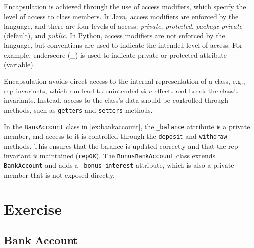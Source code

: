 \documentclass[oneside,11pt,dvipsnames]{book}
\newcommand{\code}[1]{\texttt{#1}}
\begin{document}
Encapsulation is achieved through the use of access modifiers, which specify the level of access to class members. In Java, access modifiers are enforced by the language, and there are four levels of access: \emph{private}, \emph{protected}, \emph{package-private} (default), and \emph{public}.  In Python, access modifiers are not enforced by the language, but conventions are used to indicate the intended level of access. For example, underscore (\_) is used to indicate private or protected attribute (variable). %

Encapsulation avoids direct access to the internal representation of a class, e.g., rep-invariants, which can lead to unintended side effects and break the class's invariants. Instead, access to the class's data should be controlled through methods, such as \code{getters} and \code{setters} methods.

In the \code{BankAccount} class in \autoref{ex:bankaccount}, the \code{\_balance} attribute is a private member, and access to it is controlled through the \code{deposit} and \code{withdraw} methods. This ensures that the balance is updated correctly and that the rep-invariant is maintained (\code{repOK}). The \code{BonusBankAccount} class extends \code{BankAccount} and adds a \code{\_bonus\_interest} attribute, which is also a private member that is not exposed directly. 




\section{Exercise}





\subsection{Bank Account}\label{exercise:bankaccount}
\end{document}
